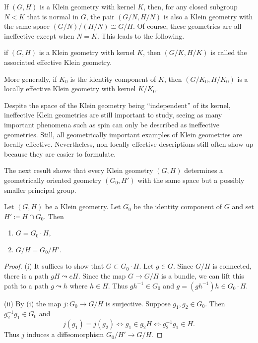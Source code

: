 If $(G,H)$ is a Klein geometry with kernel $K$, then, for any closed subgroup $N<K$ that is normal in $G$, the pair $(G\slash N,H\slash N)$ is also a Klein geometry with the same space $(G\slash N)\slash(H\slash N)\cong G\slash H$. Of course, these geometries are all ineffective except when $N=K$. This leads to the following.

\begin{defn}
    if $(G,H)$ is a Klein geometry with kernel $K$, then $(G\slash K,H\slash K)$ is called the associated effective Klein geometry.
\end{defn}

More generally, if $K_0$ is the identity component of $K$, then $(G\slash K_0,H\slash K_0)$ is a locally effective Klein geometry with kernel $K\slash K_0$.

\begin{rem}
    Despite the space of the Klein geometry being ``independent'' of its kernel, ineffective Klein geometries are still important to study, seeing as many important phenomena such as spin can only be described as ineffective geometries. Still, all geometrically important examples of Klein geometries are locally effective. Nevertheless, non-locally effective descriptions still often show up because they are easier to formulate. 
\end{rem}

The next result shows that every Klein geometry $(G,H)$ determines a geometrically oriented geometry $(G_0,H')$ with the same space but a possibly smaller principal group.

\begin{prop}
    Let $(G,H)$ be a Klein geometry. Let $G_0$ be the identity component of $G$ and set $H'\coloneqq H\cap G_0$. Then
    \begin{enumerate}[label=(\roman*)]
        \item $G=G_0\cdot H$,
        \item $G\slash H=G_0\slash H'$.
    \end{enumerate}
\end{prop}
\begin{proof}
    (i) It suffices to show that $G\subset G_0\cdot H$. Let $g\in G$. Since $G\slash H$ is connected, there is a path $gH\leadsto eH$. Since the map $G\to G\slash H$ is a bundle, we can lift this path to a path $g\leadsto h$ where $h\in H$. Thus $gh^{-1}\in G_0$ and $g=(gh^{-1})h\in G_0\cdot H$.

    (ii) By (i) the map $j:G_0\to G\slash H$ is surjective. Suppose $g_1,g_2\in G_0$. Then $g_2^{-1}g_1\in G_0$ and
    \[j(g_1)=j(g_2)\Leftrightarrow g_1\in g_2H\Leftrightarrow g_2^{-1}g_1\in H.\]
    Thus $j$ induces a diffeomorphism $G_0\slash H'\to G\slash H$.
\end{proof}





